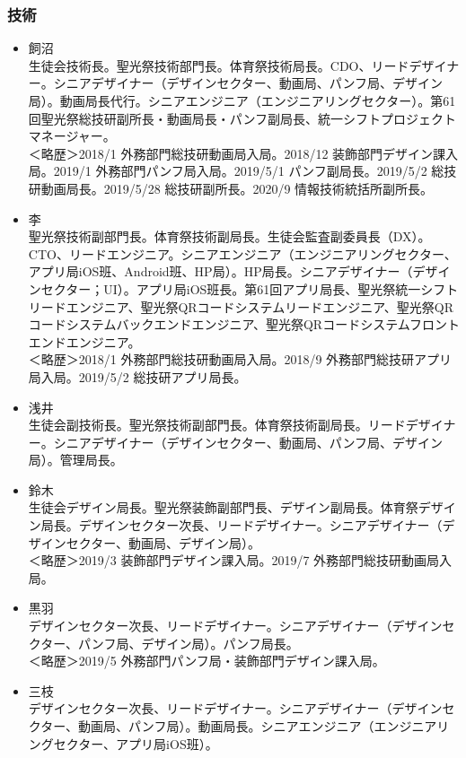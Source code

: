 \documentclass[dvipdfmx,jb5]{jarticle}
\begin{document}
\subsubsection{技術}
\begin{itemize}
  \item 飼沼\\
  生徒会技術長。聖光祭技術部門長。体育祭技術局長。CDO、リードデザイナー。シニアデザイナー（デザインセクター、動画局、パンフ局、デザイン局）。動画局長代行。シニアエンジニア（エンジニアリングセクター）。第61回聖光祭総技研副所長・動画局長・パンフ副局長、統一シフトプロジェクトマネージャー。\\
  ＜略歴＞2018/1 外務部門総技研動画局入局。2018/12 装飾部門デザイン課入局。2019/1 外務部門パンフ局入局。2019/5/1 パンフ副局長。2019/5/2 総技研動画局長。2019/5/28 総技研副所長。2020/9 情報技術統括所副所長。
  \item 李\\
  聖光祭技術副部門長。体育祭技術副局長。生徒会監査副委員長（DX）。CTO、リードエンジニア。シニアエンジニア（エンジニアリングセクター、アプリ局iOS班、Android班、HP局）。HP局長。シニアデザイナー（デザインセクター；UI）。アプリ局iOS班長。第61回アプリ局長、聖光祭統一シフトリードエンジニア、聖光祭QRコードシステムリードエンジニア、聖光祭QRコードシステムバックエンドエンジニア、聖光祭QRコードシステムフロントエンドエンジニア。\\
  ＜略歴＞2018/1 外務部門総技研動画局入局。2018/9 外務部門総技研アプリ局入局。2019/5/2 総技研アプリ局長。
  \item 浅井\\
  生徒会副技術長。聖光祭技術副部門長。体育祭技術副局長。リードデザイナー。シニアデザイナー（デザインセクター、動画局、パンフ局、デザイン局）。管理局長。
  \item 鈴木\\
  生徒会デザイン局長。聖光祭装飾副部門長、デザイン副局長。体育祭デザイン局長。デザインセクター次長、リードデザイナー。シニアデザイナー（デザインセクター、動画局、デザイン局）。\\
  ＜略歴＞2019/3 装飾部門デザイン課入局。2019/7 外務部門総技研動画局入局。
  \item 黒羽\\
  デザインセクター次長、リードデザイナー。シニアデザイナー（デザインセクター、パンフ局、デザイン局）。パンフ局長。\\
  ＜略歴＞2019/5 外務部門パンフ局・装飾部門デザイン課入局。
  \item 三枝\\
  デザインセクター次長、リードデザイナー。シニアデザイナー（デザインセクター、動画局、パンフ局）。動画局長。シニアエンジニア（エンジニアリングセクター、アプリ局iOS班）。\\

\end{itemize}
\end{document}
